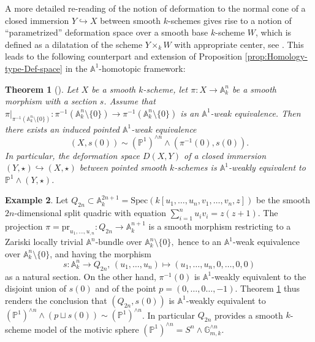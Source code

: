 \documentclass[10pt]{alggeom}
\newtheorem{thm}{Theorem}[section]
\theoremstyle{definition}
\newtheorem{ex}[thm]{Example}
\numberwithin{equation}{section}
\begin{document}
\vspace{0.1cm}

A more detailed re-reading of the notion of deformation to the normal
cone of a closed immersion $Y\hookrightarrow X$ between smooth $k$-schemes
gives rise to a notion of ``parametrized'' deformation space over
a smooth base $k$-scheme $W$, which is defined as a dilatation of
the scheme $Y\times_{k}W$ with appropriate center, see \cite[Construction 2.1.2]{ADO21}.
This leads to the following counterpart and extension of Proposition
\ref{prop:Homology-type-Def-space} in the $\mathbb{A}^{1}$-homotopic
framework:
\begin{thm}[{\cite[Theorem 2]{ADO21}}]
\label{thm:-Deformation=00003Dsuspension} Let $X$ be a smooth $k$-scheme,
let $\pi:X\to\mathbb{A}_{k}^{n}$ be a smooth morphism with a section
$s$. Assume that $\pi|_{\pi^{-1}(\mathbb{A}_{k}^{n}\setminus\{0\})}:\pi^{-1}(\mathbb{A}_{k}^{n}\setminus\{0\})\to\pi^{-1}(\mathbb{A}_{k}^{n}\setminus\{0\})$
is an $\mathbb{A}^{1}$-weak equivalence. Then there exists an induced
pointed $\mathbb{A}^{1}$-weak equivalence 
\[
(X,s(0))\sim(\mathbb{P}^{1})^{\wedge n}\wedge(\pi^{-1}(0),s(0)).
\]
In particular, the deformation space $D(X,Y)$ of a closed immersion
$(Y,\star)\hookrightarrow(X,\star)$ between pointed smooth $k$-schemes
is $\mathbb{A}^{1}$-weakly equivalent to $\mathbb{P}^{1}\wedge(Y,\star)$. 
\end{thm}

\begin{ex}
Let $Q_{2n}\subset\mathbb{A}_{k}^{2n+1}=\mathrm{Spec}(k[u_{1},\ldots,u_{n},v_{1},\ldots,v_{n},z])$
be the smooth $2n$-dimensional split quadric with equation $\sum_{i=1}^{n}u_{i}v_{i}=z(z+1)$.
The projection $\pi=\mathrm{pr}_{u_{1},\ldots,u_{,n}}:Q_{2n}\to\mathbb{A}_{k}^{n+1}$
is a smooth morphism restricting to a Zariski locally trivial $\mathbb{A}^{n}$-bundle
over $\mathbb{A}_{k}^{n}\setminus\{0\},$ hence to an $\mathbb{A}^{1}$-weak
equivalence over $\mathbb{A}_{k}^{n}\setminus\{0\}$, and having the
morphism 
\[
s:\mathbb{A}_{k}^{n}\to Q_{2n},\,(u_{1},\ldots,u_{n})\mapsto(u_{1},\ldots,u_{n},0,\ldots,0,0)
\]
as a natural section. On the other hand, $\pi^{-1}(0)$ is $\mathbb{A}^{1}$-weakly
equivalent to the disjoint union of $s(0)$ and of the point $p=(0,\ldots,0\ldots,-1)$.
Theorem \ref{thm:-Deformation=00003Dsuspension} thus renders the
conclusion that $(Q_{2n},s(0))$ is $\mathbb{A}^{1}$-weakly equivalent
to $(\mathbb{P}^{1})^{\wedge n}\wedge (p\sqcup s(0))\sim(\mathbb{P}^{1})^{\wedge n}$.
In particular $Q_{2n}$ provides a smooth $k$-scheme model of the
motivic sphere $(\mathbb{P}^{1})^{\wedge n}=S^{n}\wedge\mathbb{G}_{m,k}^{\wedge n}$. 
\end{ex}
\end{document}
